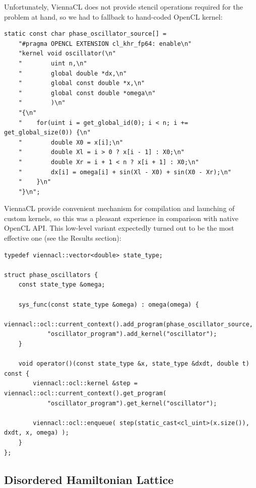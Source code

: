 \documentclass[1p]{elsarticle}
\begin{document}
Unfortunately, ViennaCL does not provide stencil operations required for
the problem at hand, so we had to fallback to hand-coded OpenCL kernel:
\begin{lstlisting}
static const char phase_oscillator_source[] =
    "#pragma OPENCL EXTENSION cl_khr_fp64: enable\n"
    "kernel void oscillator(\n"
    "        uint n,\n"
    "        global double *dx,\n"
    "        global const double *x,\n"
    "        global const double *omega\n"
    "        )\n"
    "{\n"
    "    for(uint i = get_global_id(0); i < n; i += get_global_size(0)) {\n"
    "        double X0 = x[i];\n"
    "        double Xl = i > 0 ? x[i - 1] : X0;\n"
    "        double Xr = i + 1 < n ? x[i + 1] : X0;\n"
    "        dx[i] = omega[i] + sin(Xl - X0) + sin(X0 - Xr);\n"
    "    }\n"
    "}\n";
\end{lstlisting}
ViennaCL provide convenient mechanism for compilation and launching of custom
kernels, so this was a pleasant experience in comparison with native OpenCL
API. This low-level variant expectedly turned out to be the most effective one
(see the Results section):
\begin{lstlisting}[firstnumber=last]
typedef viennacl::vector<double> state_type;

struct phase_oscillators {
    const state_type &omega;

    sys_func(const state_type &omega) : omega(omega) {
        viennacl::ocl::current_context().add_program(phase_oscillator_source,
            "oscillator_program").add_kernel("oscillator");
    }

    void operator()(const state_type &x, state_type &dxdt, double t) const {
        viennacl::ocl::kernel &step = viennacl::ocl::current_context().get_program(
            "oscillator_program").get_kernel("oscillator");

        viennacl::ocl::enqueue( step(static_cast<cl_uint>(x.size()), dxdt, x, omega) );
    }
};
\end{lstlisting}








%
%
\subsection{Disordered Hamiltonian Lattice}
\end{document}
